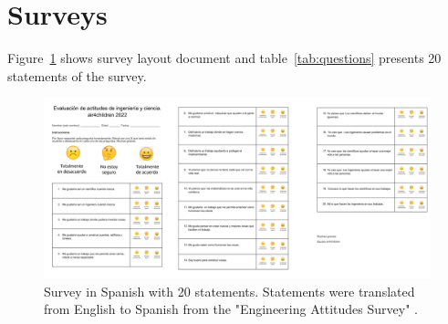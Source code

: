 \documentclass[sigconf]{acmart}
\begin{document}
\section*{Surveys}
Figure~\ref{fig:survey} shows survey layout document and table~\ref{tab:questions} presents 20 statements of the survey.
\begin{figure} %
  \centering
    \includegraphics[width=\linewidth]{fig-surveys.png}  %
    \caption{
    Survey in Spanish with 20 statements.
	Statements were translated from English to Spanish from the "Engineering Attitudes Survey" \cite{cunningham2010impact}.
    }
    \label{fig:survey}
\end{figure}
\end{document}
